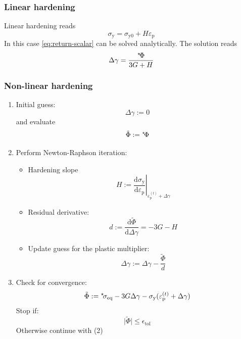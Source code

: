 \documentclass[times,namecite]{goose-article}
\newcommand\leftstar[1]{\hspace*{-.3em}~^\star\!#1}
\begin{document}
\subsubsection{Linear hardening}

Linear hardening reads
\begin{equation}
  \sigma_\mathrm{y} = \sigma_\mathrm{y0} + H \varepsilon_\mathrm{p}
\end{equation}
In this case \eqref{eq:return-scalar} can be solved analytically. The solution reads
\begin{equation}
  \Delta \gamma
  = \frac{ \leftstar{\Phi} }{ 3G + H }
\end{equation}

\subsubsection{Non-linear hardening}

\begin{enumerate}[(1)]
%
\item Initial guess:
\begin{equation}
  \Delta \gamma
    := 0
\end{equation}
and evaluate
\begin{equation}
  \tilde{\Phi}
    := \leftstar{\Phi}
\end{equation}
%
\item Perform Newton-Raphson iteration:
%
\begin{itemize}
%
\item Hardening slope
\begin{equation}
  H
  := \left.
     \frac{
       \mathrm{d} \sigma_\mathrm{y}
     }{
       \mathrm{d} \varepsilon_\mathrm{p}
     }
     \right|_{\varepsilon_\mathrm{p}^{(t)} + \Delta \gamma}
\end{equation}
%
\item Residual derivative:
\begin{equation}
  d := \frac{\mathrm{d} \tilde{\Phi}}{\mathrm{d} \Delta \gamma}
     = -3G - H
\end{equation}
%
\item Update guess for the plastic multiplier:
\begin{equation}
  \Delta \gamma := \Delta \gamma - \frac{\tilde{\Phi}}{d}
\end{equation}
%
\end{itemize}
%
\item Check for convergence:
\begin{equation}
\tilde{\Phi}
  := \leftstar{\sigma}_\mathrm{eq}
   - 3 G \Delta \gamma
   - \sigma_\mathrm{y} ( \varepsilon_\mathrm{p}^{(t)} + \Delta \gamma )
\end{equation}
Stop if:
\begin{equation}
  \big| \tilde{\Phi} \big| \leq \epsilon_\mathrm{tol}
\end{equation}
Otherwise continue with (2)
%
\end{enumerate}
\end{document}
